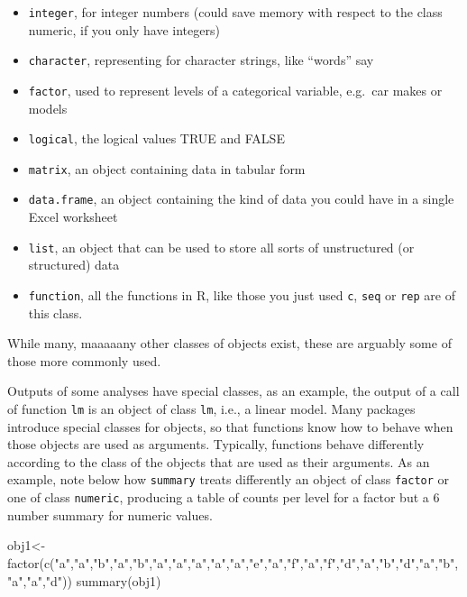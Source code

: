 \documentclass[
  letterpaper,
  DIV=11,
  numbers=noendperiod]{scrartcl}
\newenvironment{Shaded}{\begin{snugshade}}{\end{snugshade}}
\newcommand{\FunctionTok}[1]{\textcolor[rgb]{0.28,0.35,0.67}{#1}}
\newcommand{\NormalTok}[1]{\textcolor[rgb]{0.00,0.23,0.31}{#1}}
\newcommand{\OtherTok}[1]{\textcolor[rgb]{0.00,0.23,0.31}{#1}}
\newcommand{\StringTok}[1]{\textcolor[rgb]{0.13,0.47,0.30}{#1}}
\providecommand{\tightlist}{%
  \setlength{\itemsep}{0pt}\setlength{\parskip}{0pt}}
\begin{document}
\begin{itemize}
\tightlist
\item
  \texttt{integer}, for integer numbers (could save memory with respect
  to the class numeric, if you only have integers)
\item
  \texttt{character}, representing for character strings, like ``words''
  say
\item
  \texttt{factor}, used to represent levels of a categorical variable,
  e.g.~car makes or models
\item
  \texttt{logical}, the logical values TRUE and FALSE
\item
  \texttt{matrix}, an object containing data in tabular form
\item
  \texttt{data.frame}, an object containing the kind of data you could
  have in a single Excel worksheet
\item
  \texttt{list}, an object that can be used to store all sorts of
  unstructured (or structured) data
\item
  \texttt{function}, all the functions in R, like those you just used
  \texttt{c}, \texttt{seq} or \texttt{rep} are of this class.
\end{itemize}

While many, maaaaany other classes of objects exist, these are arguably
some of those more commonly used.

Outputs of some analyses have special classes, as an example, the output
of a call of function \texttt{lm} is an object of class \texttt{lm},
i.e., a linear model. Many packages introduce special classes for
objects, so that functions know how to behave when those objects are
used as arguments. Typically, functions behave differently according to
the class of the objects that are used as their arguments. As an
example, note below how \texttt{summary} treats differently an object of
class \texttt{factor} or one of class \texttt{numeric}, producing a
table of counts per level for a factor but a 6 number summary for
numeric values.

\begin{Shaded}
\begin{Highlighting}[]
\NormalTok{obj1}\OtherTok{\textless{}{-}}\FunctionTok{factor}\NormalTok{(}\FunctionTok{c}\NormalTok{(}\StringTok{"a"}\NormalTok{,}\StringTok{"a"}\NormalTok{,}\StringTok{"b"}\NormalTok{,}\StringTok{"a"}\NormalTok{,}\StringTok{"b"}\NormalTok{,}\StringTok{"a"}\NormalTok{,}\StringTok{"a"}\NormalTok{,}\StringTok{"a"}\NormalTok{,}\StringTok{"a"}\NormalTok{,}\StringTok{"a"}\NormalTok{,}\StringTok{"e"}\NormalTok{,}\StringTok{"a"}\NormalTok{,}\StringTok{"f"}\NormalTok{,}\StringTok{"a"}\NormalTok{,}\StringTok{"f"}\NormalTok{,}\StringTok{"d"}\NormalTok{,}\StringTok{"a"}\NormalTok{,}\StringTok{"b"}\NormalTok{,}\StringTok{"d"}\NormalTok{,}\StringTok{"a"}\NormalTok{,}\StringTok{"b"}\NormalTok{,}\StringTok{"a"}\NormalTok{,}\StringTok{"a"}\NormalTok{,}\StringTok{"d"}\NormalTok{))}
\FunctionTok{summary}\NormalTok{(obj1)}
\end{Highlighting}
\end{Shaded}
\end{document}
